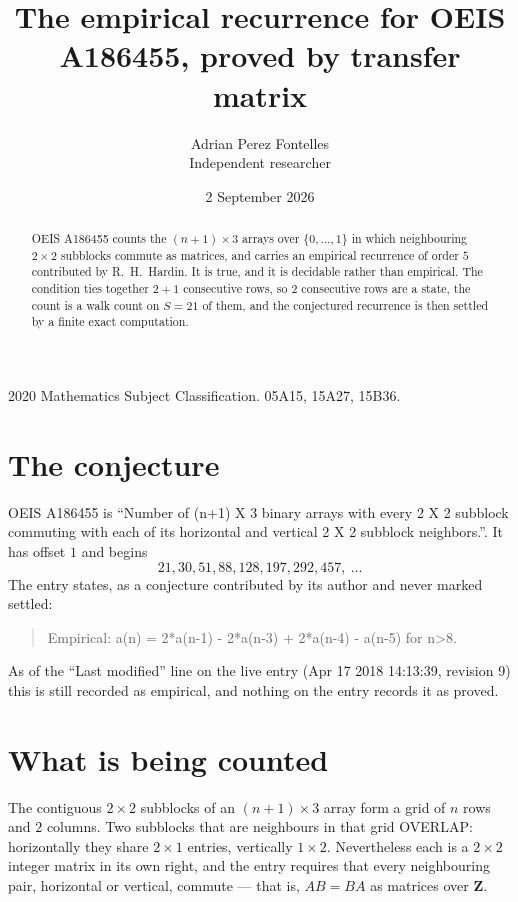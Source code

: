\documentclass[11pt,a4paper]{article}
\title{The empirical recurrence for OEIS A186455, proved by transfer matrix}
\author{Adrian Perez Fontelles\\ \small Independent researcher}
\date{2 September 2026}
\theoremstyle{plain}
\theoremstyle{definition}
\begin{document}
\maketitle

\begin{abstract}
OEIS A186455 counts the $(n+1)\times3$ arrays over $\{0,\dots,1\}$ in which
neighbouring $2\times2$ subblocks commute as matrices, and carries an empirical recurrence
of order $5$ contributed by R.~H.~Hardin. It is true, and it is decidable rather than
empirical. The condition ties together $2+1$ consecutive rows, so $2$ consecutive rows are
a state, the count is a walk count on $S=21$ of them, and the conjectured recurrence is then
settled by a finite exact computation.
\end{abstract}

\noindent\small 2020 Mathematics Subject Classification. 05A15, 15A27, 15B36.\normalsize

\section{The conjecture}

OEIS A186455 is ``Number of (n+1) X 3 binary arrays with every 2 X 2 subblock commuting with each of its horizontal and vertical 2 X 2 subblock neighbors.''. It has offset $1$ and begins
\[
21, 30, 51, 88, 128, 197, 292, 457,\ \dots
\]
The entry states, as a conjecture contributed by its author and never marked settled:
\begin{quote}
Empirical: a(n) = 2*a(n-1) - 2*a(n-3) + 2*a(n-4) - a(n-5) for n>8.
\end{quote}
As of the ``Last modified'' line on the live entry (Apr 17 2018 14:13:39, revision 9) this is still
recorded as empirical, and nothing on the entry records it as proved.

\section{What is being counted}

The contiguous $2\times2$ subblocks of an $(n+1)\times3$ array form a grid of $n$
rows and $2$ columns. Two subblocks that are neighbours in that
grid OVERLAP: horizontally they share $2\times1$ entries, vertically
$1\times2$. Nevertheless each is a $2\times2$ integer matrix in its own right, and
the entry requires that every neighbouring pair, horizontal or vertical, commute --- that is,
$AB=BA$ as matrices over $\mathbf{Z}$.
\end{document}

